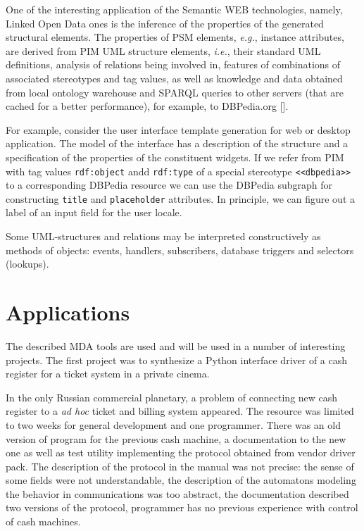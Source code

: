 \documentclass[conference,a4paper]{IEEEtran}
\begin{document}
One of the interesting application of the Semantic WEB technologies, namely, Linked Open Data ones is the inference of the properties of the generated structural elements.  The properties of PSM elements, \emph{e.g.}, instance attributes, are derived from PIM UML structure elements, \emph{i.e.}, their standard UML definitions, analysis of relations being involved in, features of combinations of associated stereotypes and tag values, as well as knowledge and data obtained from local ontology warehouse and SPARQL queries to other servers (that are cached for a better performance), for example, to DBPedia.org [].

For example, consider the user interface template generation for web or desktop application.  The model of the interface has a description of the structure and a specification of the properties of the constituent widgets.  If we refer from PIM with tag values \texttt{rdf:object} andd \texttt{rdf:type} of a special stereotype \texttt{<<dbpedia>>} to a corresponding DBPedia resource we can use the DBPedia subgraph for constructing \texttt{title} and \texttt{placeholder} attributes.  In principle, we can figure out a label of an input field for the user locale.


Some UML-structures and relations may be interpreted constructively as methods of objects: events, handlers, subscribers, database triggers and selectors (lookups).


\section{Applications}
\label{sec:app}

The described MDA tools are used and will be used in a number of interesting projects.  The first project was to synthesize a Python interface driver of a cash register for a ticket system in a private cinema.

In the only Russian commercial planetary, a problem of connecting new cash register to a \emph{ad hoc} ticket and billing system appeared.  The resource was limited to two weeks for general development and one programmer.  There was an old version of program for the previous cash machine, a documentation to the new one as well as test utility implementing the protocol obtained from vendor driver pack.  The description of the protocol in the manual was not precise: the sense of some fields were not understandable, the description of the automatons modeling the behavior in communications was too abstract, the documentation described two versions of the protocol, programmer has no previous experience with control of cash machines.
\end{document}
